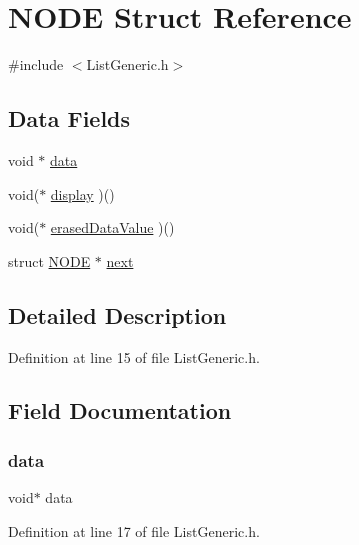 \hypertarget{struct_n_o_d_e}{}\section{N\+O\+DE Struct Reference}
\label{struct_n_o_d_e}


{\ttfamily \#include $<$List\+Generic.\+h$>$}

\subsection*{Data Fields}
\begin{DoxyCompactItemize}
\item 
void $\ast$ \mbox{\hyperlink{struct_n_o_d_e_a735984d41155bc1032e09bece8f8d66d}{data}}
\item 
void($\ast$ \mbox{\hyperlink{struct_n_o_d_e_adf2a141d2970ba324b6576930959a524}{display}} )()
\item 
void($\ast$ \mbox{\hyperlink{struct_n_o_d_e_af74860f29ae9aa4b463e2378bcd7a298}{erased\+Data\+Value}} )()
\item 
struct \mbox{\hyperlink{struct_n_o_d_e}{N\+O\+DE}} $\ast$ \mbox{\hyperlink{struct_n_o_d_e_aab1da0ec3c3507ad0a648c72f34b3267}{next}}
\end{DoxyCompactItemize}


\subsection{Detailed Description}


Definition at line 15 of file List\+Generic.\+h.



\subsection{Field Documentation}
\mbox{\label{struct_n_o_d_e_a735984d41155bc1032e09bece8f8d66d}} 
\subsubsection{\texorpdfstring{data}{data}}
{\footnotesize\ttfamily void$\ast$ data}



Definition at line 17 of file List\+Generic.\+h.

\mbox{\label{struct_n_o_d_e_adf2a141d2970ba324b6576930959a524}} 
